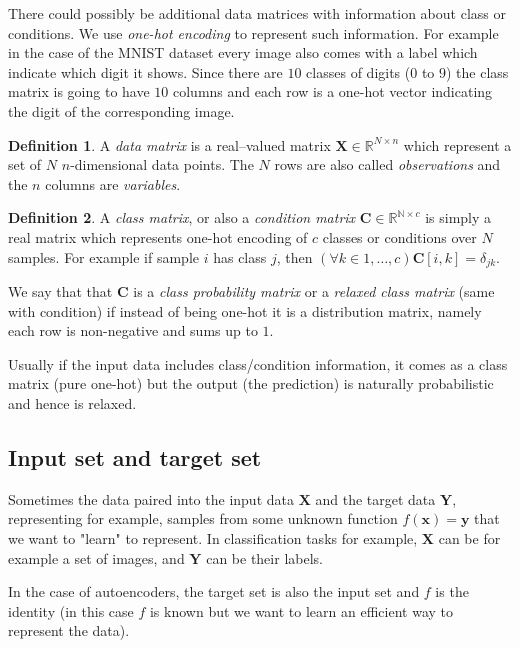 \documentclass[11pt, a4paper]{report}
\theoremstyle{plain}
\theoremstyle{definition}
\newtheorem{mydef}{Definition}[chapter]
\theoremstyle{remark}
\newcommand{\N}{\mathbb{N}}
\newcommand{\R}{\mathbb{R}}
\newcommand{\X}{\mathbf{X}}
\newcommand{\x}{\mathbf{x}}
\newcommand{\Y}{\mathbf{Y}}
\newcommand{\y}{\mathbf{y}}
\newcommand{\bv}[1]{\boldsymbol{#1}}
\begin{document}
There could possibly be additional data matrices with information about
class or conditions. We use \emph{one-hot encoding} to represent such
information.
For example in the case of the MNIST dataset every image also comes with a label
which indicate which digit it shows. Since there are $10$ classes of digits ($0$
to $9$) the class matrix is going to have $10$ columns and each row is a one-hot
vector indicating the digit of the corresponding image.

\begin{mydef}
\label{def:datamatrix}
A \emph{data matrix} is a real--valued matrix $\bv{X} \in \R^{N \times n}$
which represent a set of $N$ $n$-dimensional data points.
The $N$ rows are also called \emph{observations} and the $n$ columns are
\emph{variables}.
\end{mydef}

\begin{mydef}
\label{def:classmatrix}
A \emph{class matrix}, or also a \emph{condition matrix}
$\bv{C} \in \R^{\N \times c}$ is simply a real matrix which
represents one-hot encoding of $c$ classes or conditions over $N$ samples.
For example if sample $i$ has class $j$, then 
$(\forall k\in 1, \dots, c) \bv{C}[i,k] = \delta_{jk}$.

We say that that $\bv{C}$ is a \emph{class probability matrix} or a \emph{relaxed
class matrix} (same with condition)
if instead of being one-hot it is a distribution matrix, namely each row is
non-negative and sums up to $1$.
\end{mydef}

Usually if the input data includes class/condition information, it comes as a
class matrix (pure one-hot) but the output (the prediction) is naturally 
probabilistic and hence is relaxed.

\subsection{Input set and target set}
Sometimes the data paired into the input data $\X$ and the
target data $\Y$, 
representing for example, samples from some unknown function $f(\x) = \y$
that we want to "learn" to represent.
In classification tasks for example, $\X$ can be for example a set of images,
and $\Y$ can be their labels.

In the case of autoencoders, the target set is also the input set and $f$ is the
identity (in this case $f$ is known but we want to learn an efficient way
to represent the data).
\end{document}
